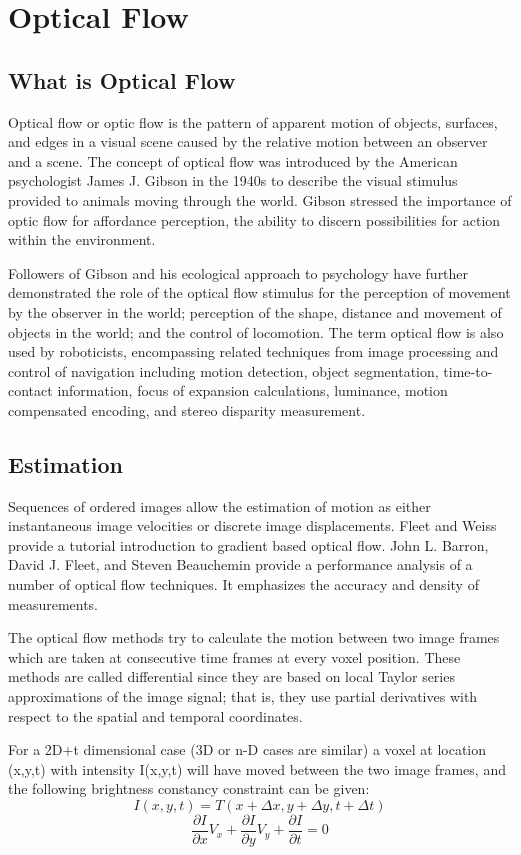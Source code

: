 \section{Optical Flow}
\subsection{What is Optical Flow}
Optical flow or optic flow is the pattern of apparent motion of objects, surfaces,
and edges in a visual scene caused by the relative motion between an observer and a
scene. The concept of optical flow was introduced by the American psychologist James
J. Gibson in the 1940s to describe the visual stimulus provided to animals moving
through the world. Gibson stressed the importance of optic flow for affordance
perception, the ability to discern possibilities for action within the environment.\par
Followers of Gibson and his ecological approach to psychology have further demonstrated the role of the optical flow stimulus for the perception of movement by
the observer in the world; perception of the shape, distance and movement of objects in
the world; and the control of locomotion.
The term optical flow is also used by roboticists, encompassing related
techniques from image processing and control of navigation including motion detection,
object segmentation, time-to-contact information, focus of expansion calculations,
luminance, motion compensated encoding, and stereo disparity measurement.

\subsection{Estimation}
Sequences of ordered images allow the estimation of motion as either
instantaneous image velocities or discrete image displacements. Fleet and Weiss
provide a tutorial introduction to gradient based optical flow. John L. Barron, David J.
Fleet, and Steven Beauchemin provide a performance analysis of a number of optical
flow techniques. It emphasizes the accuracy and density of measurements.\par
The optical flow methods try to calculate the motion between two image frames
which are taken at consecutive time frames at every voxel position. These methods are
called differential since they are based on local Taylor series approximations of the
image signal; that is, they use partial derivatives with respect to the spatial and temporal
coordinates. \par
For a 2D+t dimensional case (3D or n-D cases are similar) a voxel at location (x,y,t)
with intensity I(x,y,t) will have moved between the two image frames, and the following
brightness constancy constraint can be given:
\begin{equation}
I(x,y,t) = T(x + \Delta x, y + \Delta y, t + \Delta t)
\end{equation}
\begin{equation}
\frac{\partial I}{\partial x}V_x + \frac{\partial I}{\partial y}V_y + \frac{\partial I}{\partial t} = 0
\end{equation}

